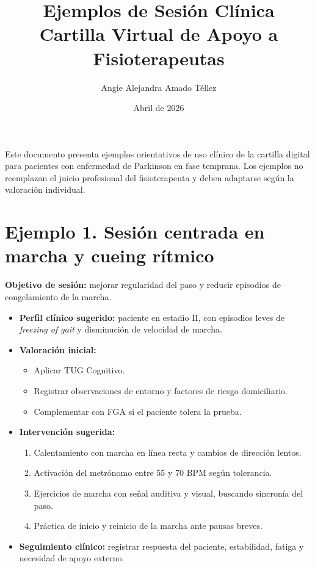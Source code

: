 \documentclass[12pt,a4paper]{article}
\title{\textbf{Ejemplos de Sesión Clínica}\\[0.2cm]\large Cartilla Virtual de Apoyo a Fisioterapeutas}
\author{Angie Alejandra Amado Téllez}
\date{Abril de 2026}
\begin{document}
\maketitle

\noindent Este documento presenta ejemplos orientativos de uso clínico de la cartilla digital para pacientes con enfermedad de Parkinson en fase temprana. Los ejemplos no reemplazan el juicio profesional del fisioterapeuta y deben adaptarse según la valoración individual.

\section{Ejemplo 1. Sesión centrada en marcha y cueing rítmico}

\textbf{Objetivo de sesión:} mejorar regularidad del paso y reducir episodios de congelamiento de la marcha.

\begin{itemize}
    \item \textbf{Perfil clínico sugerido:} paciente en estadio II, con episodios leves de \textit{freezing of gait} y disminución de velocidad de marcha.
    \item \textbf{Valoración inicial:}
    \begin{itemize}
        \item Aplicar TUG Cognitivo.
        \item Registrar observaciones de entorno y factores de riesgo domiciliario.
        \item Complementar con FGA si el paciente tolera la prueba.
    \end{itemize}
    \item \textbf{Intervención sugerida:}
    \begin{enumerate}
        \item Calentamiento con marcha en línea recta y cambios de dirección lentos.
        \item Activación del metrónomo entre 55 y 70 BPM según tolerancia.
        \item Ejercicios de marcha con señal auditiva y visual, buscando sincronía del paso.
        \item Práctica de inicio y reinicio de la marcha ante pausas breves.
    \end{enumerate}
    \item \textbf{Seguimiento clínico:} registrar respuesta del paciente, estabilidad, fatiga y necesidad de apoyo externo.
\end{itemize}
\end{document}

